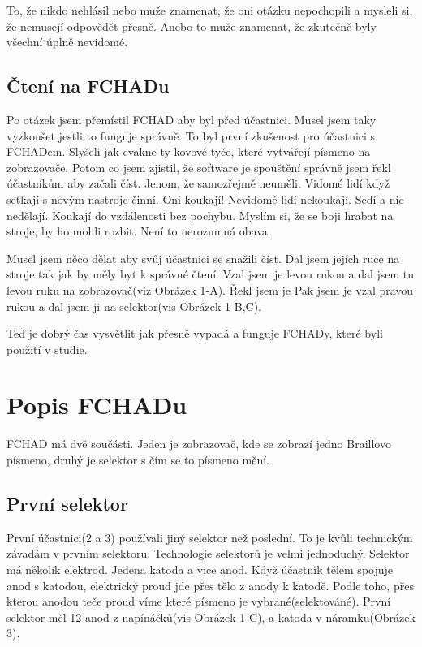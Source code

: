To, že nikdo nehlásil  nebo  muže znamenat, že oni otázku nepochopili a mysleli si, že nemusejí odpovědět přesně.  Anebo to muže znamenat, že zkutečně byly všechní úplně nevidomé.

\subsection{Čtení na FCHADu}

Po otázek jsem přemístil FCHAD aby byl před účastnici.  Musel jsem taky vyzkoušet jestli to funguje správně. To byl první zkušenost pro účastnici s FCHADem.  Slyšeli jak cvakne ty kovové tyče, které vytvářejí písmeno na zobrazovače.  Potom co jsem zjistil, že software je spouštění správně jsem řekl účastníkům aby začali číst.  Jenom, že samozřejmě neuměli.  Vidomé lidí když setkají s novým nastroje činní. Oni koukají!  Nevidomé lidí nekoukají.  Sedí a nic nedělají.  Koukají do vzdálenosti bez pochybu.  Myslím si, že se boji hrabat na stroje, by ho mohli rozbit.  Není to nerozumná obava.

Musel jsem něco dělat aby svůj účastnici se snažili číst. Dal jsem jejích ruce na stroje tak jak by měly byt k správné čtení. Vzal jsem je levou rukou a dal jsem tu levou ruku na zobrazovač(viz Obrázek 1-A). Řekl jsem je   Pak jsem je vzal pravou rukou a dal jsem ji na selektor(vis Obrázek 1-B,C).

Teď je dobrý čas vysvětlit jak přesně vypadá a funguje FCHADy, které byli použití v studie.

\section{Popis FCHADu}

FCHAD má dvě součásti. Jeden je zobrazovač, kde se zobrazí jedno Braillovo písmeno, druhý je selektor s čím se to písmeno mění.

\subsection{První selektor}

První účastnici(2 a 3) používali jiný selektor než poslední.  To je kvůli technickým závadám v prvním selektoru.   Technologie selektorů je velmi jednoduchý.  Selektor má několik elektrod. Jedena katoda a vice anod. Když účastník tělem spojuje anod s katodou, elektrický proud jde přes tělo z anody k katodě. Podle toho, přes kterou anodou teče proud víme které písmeno je vybrané(selektováné).   První selektor měl 12 anod z napínáčků(vis Obrázek 1-C), a katoda v náramku(Obrázek 3).


